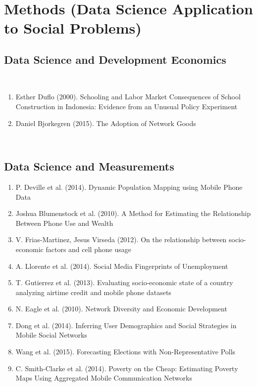 \section{Methods (Data Science Application to Social Problems)}
\subsection{Data Science and Development Economics}  \\  
\begin{enumerate}  
\item  Esther Duflo (2000).  Schooling and Labor Market Consequences of School Construction in Indonesia: Evidence from an Unusual Policy Experiment \cite{Duflo_2000} 
\item Daniel Bjorkegren (2015).  The Adoption of Network Goods \cite{Bjorkegren} 
\end{enumerate}  
\\  
\subsection{Data Science and Measurements}  
\begin{enumerate}  
\item  P. Deville et al. (2014).  Dynamic Population Mapping using Mobile Phone Data\cite{Deville_2014} 
\item  Joshua Blumenstock et al. (2010).  A Method for Estimating the Relationship Between Phone Use and Wealth\cite{blumenstock2010method}  
\item  V. Frias-Martinez, Jesus Virseda (2012).  On the relationship between socio-economic factors and cell phone usage \cite{Frias_Martinez_2012} 
\item A. Llorente et al. (2014).  Social Media Fingerprints of Unemployment\cite{Llorente_2015}  
\item T. Gutierrez et al. (2013).  Evaluating socio-economic state of a country analyzing airtime credit and mobile phone datasets\cite{gutierrez2013evaluating}  
\item N. Eagle et al. (2010).  Network Diversity and Economic Development\cite{eagle2010network}   
\item Dong et al. (2014).  Inferring User Demographics and Social Strategies in Mobile Social Networks \cite{Dong:2014:IUD:2623330.2623703} 
\item Wang et al. (2015).  Forecasting Elections with Non-Representative Polls\cite{Wang2015980} 
\item C. Smith-Clarke et al. (2014).  Poverty on the Cheap: Estimating Poverty Maps Using Aggregated Mobile Communication Networks\cite{Smith-Clarke:2014:PCE:2556288.2557358} 
\end{enumerate}  
\\
